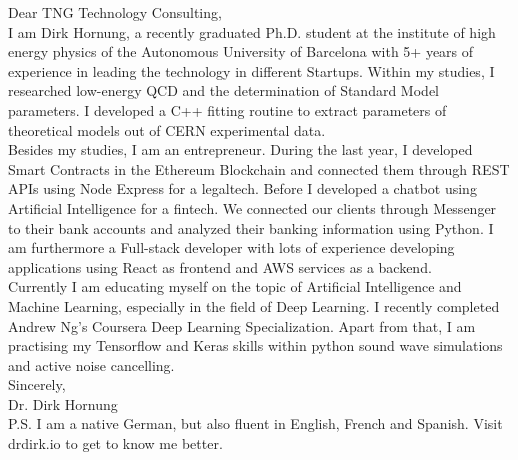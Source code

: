 \documentclass[11pt]{article}
\begin{document}



 Dear TNG Technology Consulting, \\

 \noindent I am Dirk Hornung, a recently graduated Ph.D. student at
 the institute of high energy physics of the Autonomous University of
 Barcelona with 5+ years of experience in leading the technology in
 different Startups. Within my studies, I researched low-energy QCD
 and the determination of Standard Model parameters. I developed a C++
 fitting routine to extract parameters of
 theoretical models out of CERN experimental data. \\

 \noindent Besides my studies, I am an entrepreneur. During the last year, I
 developed Smart Contracts in the Ethereum Blockchain and connected them through
 REST APIs using Node Express for a legaltech. Before I developed a chatbot
 using Artificial Intelligence for a fintech. We connected our clients through
 Messenger to their bank accounts and analyzed their banking information using
 Python. I am furthermore a Full-stack developer with lots of experience
 developing applications using React as frontend and AWS services as a backend.  \\

 \noindent Currently I am educating myself on the topic of Artificial Intelligence
 and Machine Learning, especially in the field of Deep Learning. I recently completed
 Andrew Ng's Coursera Deep Learning Specialization. Apart from that, I am practising my
 Tensorflow and Keras skills within python sound wave simulations and active noise cancelling.\\

 \noindent Sincerely, \\
 Dr. Dirk Hornung \\

 \noindent P.S. I am a native German, but also fluent in English, French and
 Spanish. Visit drdirk.io to get to know me better.

 
\end{document}
